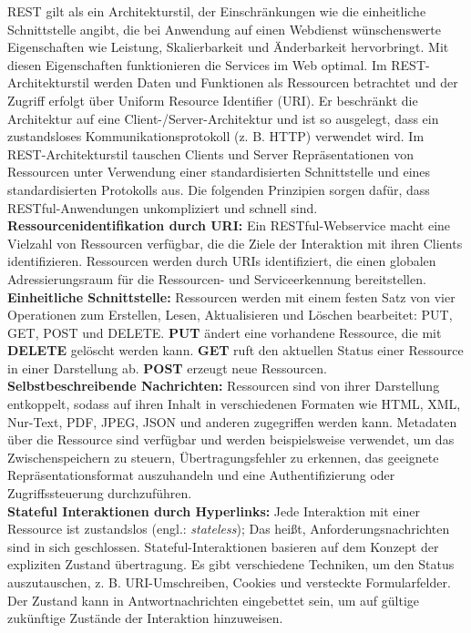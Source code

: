 REST gilt als ein Architekturstil, der Einschränkungen wie die einheitliche Schnittstelle angibt, die bei Anwendung auf einen Webdienst wünschenswerte Eigenschaften wie Leistung, Skalierbarkeit und Änderbarkeit hervorbringt. Mit diesen Eigenschaften funktionieren die Services im Web optimal. Im REST-Architekturstil werden Daten und Funktionen als Ressourcen betrachtet und der Zugriff erfolgt über Uniform Resource Identifier (URI). Er beschränkt die Architektur auf eine Client-/Server-Architektur und ist so ausgelegt, dass ein zustandsloses Kommunikationsprotokoll (z. B. HTTP) verwendet wird. Im REST-Architekturstil tauschen Clients und Server Repräsentationen von Ressourcen unter Verwendung einer standardisierten Schnittstelle und eines standardisierten Protokolls aus. Die folgenden Prinzipien sorgen dafür, dass RESTful-Anwendungen unkompliziert und schnell sind\cite{rws13od}.\\

\textbf{Ressourcenidentifikation durch URI:} Ein RESTful-Webservice macht eine Vielzahl von Ressourcen verfügbar, die die Ziele der Interaktion mit ihren Clients identifizieren. Ressourcen werden durch URIs identifiziert, die einen globalen Adressierungsraum für die Ressourcen- und Serviceerkennung bereitstellen\cite{rws13od}.\\

\textbf{Einheitliche Schnittstelle:} Ressourcen werden mit einem festen Satz von vier Operationen zum Erstellen, Lesen, Aktualisieren und Löschen bearbeitet: PUT, GET, POST und DELETE. \textbf{PUT} ändert eine vorhandene Ressource, die mit \textbf{DELETE} gelöscht werden kann. \textbf{GET} ruft den aktuellen Status einer Ressource in einer Darstellung ab. \textbf{POST} erzeugt neue Ressourcen\cite{rws13od}.\\

\textbf{Selbstbeschreibende Nachrichten:} Ressourcen sind von ihrer Darstellung entkoppelt, sodass auf ihren Inhalt in verschiedenen Formaten wie HTML, XML, Nur-Text, PDF, JPEG, JSON und anderen zugegriffen werden kann. Metadaten über die Ressource sind verfügbar und werden beispielsweise verwendet, um das Zwischenspeichern zu steuern, Übertragungsfehler zu erkennen, das geeignete Repräsentationsformat auszuhandeln und eine Authentifizierung oder Zugriffssteuerung durchzuführen\cite{rws13od}.\\

\textbf{Stateful Interaktionen durch Hyperlinks:} Jede Interaktion mit einer Ressource ist zustandslos (engl.: \textit{stateless}); Das heißt, Anforderungsnachrichten sind in sich geschlossen. Stateful-Interaktionen basieren auf dem Konzept der expliziten Zustand übertragung. Es gibt verschiedene Techniken, um den Status auszutauschen, z. B. URI-Umschreiben, Cookies und versteckte Formularfelder. Der Zustand kann in Antwortnachrichten eingebettet sein, um auf gültige zukünftige Zustände der Interaktion hinzuweisen\cite{rws13od}.

